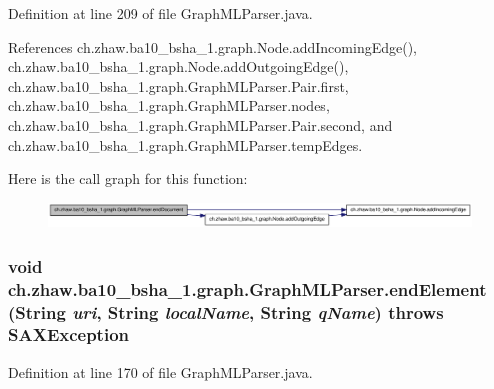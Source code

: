 Definition at line 209 of file GraphMLParser.java.

References ch.zhaw.ba10\_\-bsha\_\-1.graph.Node.addIncomingEdge(), ch.zhaw.ba10\_\-bsha\_\-1.graph.Node.addOutgoingEdge(), ch.zhaw.ba10\_\-bsha\_\-1.graph.GraphMLParser.Pair.first, ch.zhaw.ba10\_\-bsha\_\-1.graph.GraphMLParser.nodes, ch.zhaw.ba10\_\-bsha\_\-1.graph.GraphMLParser.Pair.second, and ch.zhaw.ba10\_\-bsha\_\-1.graph.GraphMLParser.tempEdges.

Here is the call graph for this function:\nopagebreak
\begin{figure}[H]
\begin{center}
\leavevmode
\includegraphics[width=420pt]{classch_1_1zhaw_1_1ba10__bsha__1_1_1graph_1_1GraphMLParser_a644cce55a39c7d1acb1625b7903a6522_cgraph}
\end{center}
\end{figure}
\hypertarget{classch_1_1zhaw_1_1ba10__bsha__1_1_1graph_1_1GraphMLParser_a3121ca1de0dbf5cc9e7d262608f55f52}{
\subsubsection[{endElement}]{\setlength{\rightskip}{0pt plus 5cm}void ch.zhaw.ba10\_\-bsha\_\-1.graph.GraphMLParser.endElement (String {\em uri}, \/  String {\em localName}, \/  String {\em qName})  throws SAXException }}
\label{classch_1_1zhaw_1_1ba10__bsha__1_1_1graph_1_1GraphMLParser_a3121ca1de0dbf5cc9e7d262608f55f52}


Definition at line 170 of file GraphMLParser.java.


